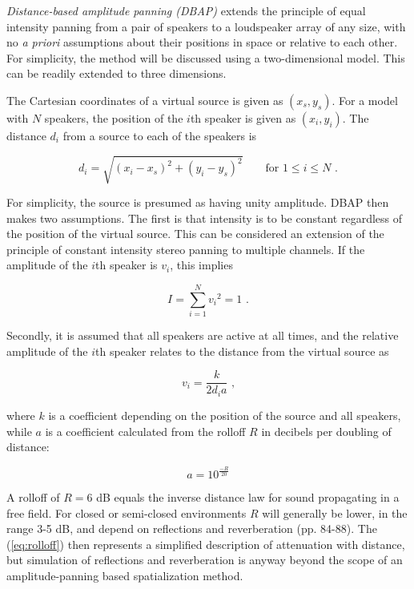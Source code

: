 \documentclass[twoside,10pt]{article}
\begin{document}
\textit{Distance-based amplitude panning (DBAP)} extends the principle of equal intensity panning from a pair of speakers to a loudspeaker array of any size, with no \textit{a priori} assumptions about their positions in space or relative to each other.
For simplicity, the method will be discussed using a two-dimensional model. This can be readily extended to three dimensions.

The Cartesian coordinates of a virtual source is given as $(x_{s}, y_{s})$. For a model with $N$ speakers, the position of the $i$th speaker is given as $(x_{i}, y_{i})$. The distance $d_{i}$ from a source to each of the speakers is

\begin{equation} \label{eq:distance}
d_{i} = \sqrt{ {(x_{i} - x_{s})}^2 + {(y_{i} - y_{s})}^2 } \qquad \textrm{for } 1 \leq i \leq N \textrm{ .}
\end{equation}

For simplicity, the source is presumed as having unity amplitude. DBAP then makes two assumptions. The first is that intensity is to be constant regardless of the position of the virtual source. This can be considered an extension of the principle of constant intensity stereo panning to multiple channels. If the amplitude of the $i$th speaker is $v_{i}$, this implies

\begin{equation} \label{eq:constant_intensity}
I = \sum_{i=1}^{N} {v_{i}}^2 = 1 \textrm{ .}
\end{equation}

Secondly, it is assumed that all speakers are active at all times, and the relative amplitude of the $i$th speaker relates to the distance from the virtual source as 

\begin{equation} \label{eq:inverse_distance}
v_{i} = \frac{k}{2 d_{i} a} \textrm{ ,}
\end{equation}

where $k$ is a coefficient depending on the position of the source and all speakers, while $a$ is a coefficient calculated from the rolloff $R$ in decibels per doubling of distance:

\begin{equation} \label{eq:rolloff}
	a = 10^{\frac{-R}{20}}
\end{equation}

A rolloff of $R = 6$ dB equals the inverse distance law for sound propagating in a free field. For closed or semi-closed environments $R$ will generally be lower, in the range 3-5 dB, and depend on reflections and reverberation \cite{Everest:2000handbook_acoustics} (pp. 84-88). The (\ref{eq:rolloff}) then represents a simplified description of attenuation with distance, but simulation of reflections and reverberation is anyway beyond the scope of an amplitude-panning based spatialization method.
\end{document}
